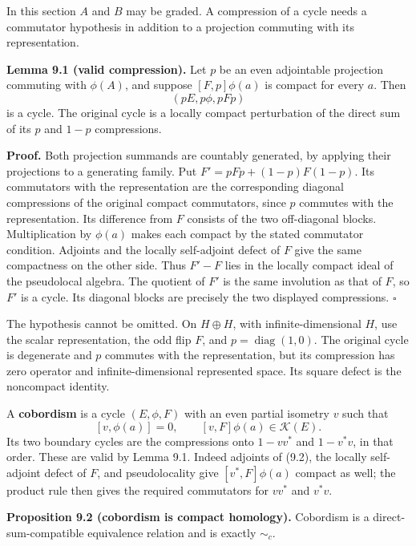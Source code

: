 \documentclass[
  11pt,
]{article}
\begin{document}
In this section \(A\) and \(B\) may be graded. A compression of a cycle
needs a commutator hypothesis in addition to a projection commuting with
its representation.

\textbf{Lemma 9.1 (valid compression).} Let \(p\) be an even adjointable
projection commuting with \(\phi(A)\), and suppose \([F,p]\phi(a)\) is
compact for every \(a\). Then \[
(pE,p\phi,pFp)
\tag{9.1}
\] is a cycle. The original cycle is a locally compact perturbation of
the direct sum of its \(p\) and \(1-p\) compressions.

\textbf{Proof.} Both projection summands are countably generated, by
applying their projections to a generating family. Put
\(F'=pFp+(1-p)F(1-p)\). Its commutators with the representation are the
corresponding diagonal compressions of the original compact commutators,
since \(p\) commutes with the representation. Its difference from \(F\)
consists of the two off-diagonal blocks. Multiplication by \(\phi(a)\)
makes each compact by the stated commutator condition. Adjoints and the
locally self-adjoint defect of \(F\) give the same compactness on the
other side. Thus \(F'-F\) lies in the locally compact ideal of the
pseudolocal algebra. The quotient of \(F'\) is the same involution as
that of \(F\), so \(F'\) is a cycle. Its diagonal blocks are precisely
the two displayed compressions. \(\square\)

The hypothesis cannot be omitted. On \(H\oplus H\), with
infinite-dimensional \(H\), use the scalar representation, the odd flip
\(F\), and \(p=\operatorname{diag}(1,0)\). The original cycle is
degenerate and \(p\) commutes with the representation, but its
compression has zero operator and infinite-dimensional represented
space. Its square defect is the noncompact identity.

A \textbf{cobordism} is a cycle \((E,\phi,F)\) with an even partial
isometry \(v\) such that \[
[v,\phi(a)]=0,\qquad [v,F]\phi(a)\in\mathcal K(E).
\tag{9.2}
\] Its two boundary cycles are the compressions onto \(1-vv^*\) and
\(1-v^*v\), in that order. These are valid by Lemma 9.1. Indeed adjoints
of (9.2), the locally self-adjoint defect of \(F\), and pseudolocality
give \([v^*,F]\phi(a)\) compact as well; the product rule then gives the
required commutators for \(vv^*\) and \(v^*v\).

\textbf{Proposition 9.2 (cobordism is compact homology).} Cobordism is a
direct-sum-compatible equivalence relation and is exactly \(\sim_c\).
\end{document}
